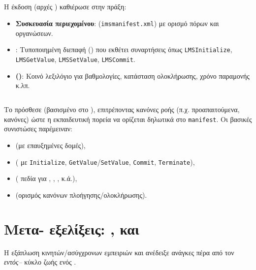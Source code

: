 \subsection*{}
Η έκδοση  (αρχές ) καθιέρωσε στην πράξη:
\begin{itemize}
  \item \textbf{Συσκευασία περιεχομένου}:  (\texttt{imsmanifest.xml}) με ορισμό πόρων και οργανώσεων.
  \item \textbf{}: Τυποποιημένη  διεπαφή () που εκθέτει συναρτήσεις όπως \texttt{LMSInitialize}, \texttt{LMSGetValue}, \texttt{LMSSetValue}, \texttt{LMSCommit}.
  \item \textbf{ ()}: Κοινό λεξιλόγιο για βαθμολογίες, κατάσταση ολοκλήρωσης, χρόνο παραμονής κ.λπ.
\end{itemize}

\subsection*{}
Το  πρόσθεσε \textbf{} (βασισμένο στο ), επιτρέποντας κανόνες ροής (π.χ. προαπαιτούμενα,  κανόνες) ώστε η εκπαιδευτική πορεία να ορίζεται δηλωτικά στο \texttt{manifest}. Οι βασικές συνιστώσες παρέμειναν:
\begin{itemize}
  \item \textbf{} (με επαυξημένες δομές),
  \item \textbf{} ( με \texttt{Initialize}, \texttt{GetValue}/\texttt{SetValue}, \texttt{Commit}, \texttt{Terminate}),
  \item \textbf{} ( πεδία για , , , κ.ά.),
  \item \textbf{} (ορισμός κανόνων πλοήγησης/ολοκλήρωσης).
\end{itemize}

\section{Μετα- εξελίξεις: ,  και }
Η εξάπλωση κινητών/ασύγχρονων εμπειριών και  ανέδειξε ανάγκες πέρα από τον \textit{εντός–} κύκλο ζωής ενός .

